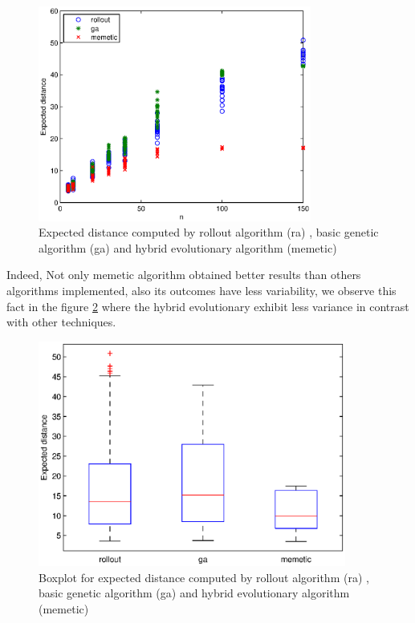 \begin{figure}[!htbp]
  \begin{center}
   \includegraphics[width=0.8\textwidth]{Images/Chapter5/comparative_results.eps}
  \end{center}
    \caption{Expected distance computed by rollout algorithm (ra) , basic genetic algorithm (ga) and hybrid evolutionary algorithm (memetic)}\label{fig:comparative_results}
\end{figure}

Indeed, Not only memetic algorithm obtained better results than others algorithms implemented, also its outcomes have less variability, we observe this fact in the figure \ref{fig:comparative_results_box} where the hybrid evolutionary exhibit less variance in contrast with other techniques.

\begin{figure}[!htbp]
  \begin{center}
   \includegraphics[width=0.9\textwidth]{Images/Chapter5/comparative_results_box.eps}
  \end{center}
    \caption{Boxplot for expected distance computed by rollout algorithm (ra) , basic genetic algorithm (ga) and hybrid evolutionary algorithm (memetic)}\label{fig:comparative_results_box}
\end{figure}

